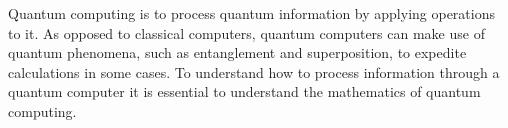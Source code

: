 Quantum computing is to process quantum information by applying operations to it. As opposed to classical computers, quantum computers can make use of quantum phenomena, such as entanglement and superposition, to expedite calculations in some cases. To understand how to process information through a quantum computer it is essential to understand the mathematics of quantum computing.





